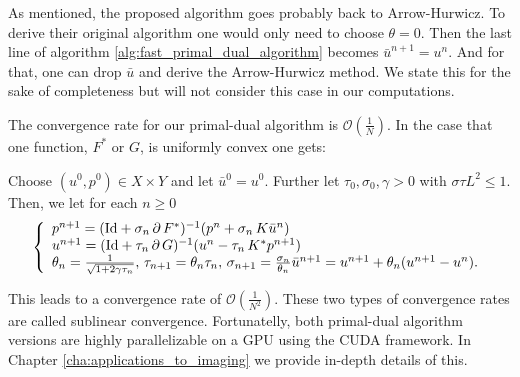    As mentioned, the proposed algorithm goes probably back to Arrow-Hurwicz. To derive their original algorithm one would only need to choose $\theta = 0$. Then the last line of algorithm \ref{alg:fast_primal_dual_algorithm} becomes $\bar{u}^{n+1} = u^{n}$. And for that, one can drop $\bar{u}$ and derive the Arrow-Hurwicz method. We state this for the sake of completeness but will not consider this case in our computations.

    The convergence rate for our primal-dual algorithm is $\mathcal{O}(\frac{1}{N})$. In the case that one function, $F^{\ast}$ or $G$, is uniformly convex one gets:

    \begin{algorithm}
    \label{alg:f_star_or_g_uniformly_convex}
        Choose $(u^{0}, p^{0}) \in X \times Y$ and let $\bar{u}^{0} = u^{0}$. Further let $\tau_{0}, \sigma_{0}, \gamma > 0$ with $\sigma\tau L^{2} \le 1$. Then, we let for each $n \ge 0$
            \begin{equation}
                \left\{ 
                    \begin{array}{l l}
                        p^{n+1} = (\textnormal{Id} + \sigma_{n}\,\partial\,F^{\ast})^{-1}(p^{n} + \sigma_{n}\,K\bar{u}^{n}) \\
                        u^{n+1} = (\textnormal{Id} + \tau_{n}\,\partial\,G)^{-1}(u^{n} - \tau_{n}\,K^{\ast}p^{n+1}) \\
                        \theta_{n} = \frac{1}{\sqrt{1 + 2\gamma\tau_{n}}}, \, \tau_{n+1} = \theta_{n}\tau_{n}, \, \sigma_{n+1} = \frac{\sigma_{n}}{\theta_{n}}
                        \bar{u}^{n+1} = u^{n+1} + \theta_{n} (u^{n+1} - u^{n}).
                    \end{array}
                \right.
            \label{eq:f_star_or_g_uniformly_convex}
            \end{equation}
    \end{algorithm}

    This leads to a convergence rate of $\mathcal{O}(\frac{1}{N^{2}})$. These two types of convergence rates are called sublinear convergence. Fortunatelly, both primal-dual algorithm versions are highly parallelizable on a GPU using the CUDA framework. In Chapter \ref{cha:applications_to_imaging} we provide in-depth details of this.



